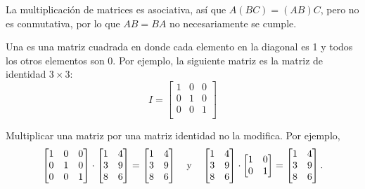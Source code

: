 La multiplicación de matrices es asociativa, así que $A(BC)=(AB)C$, pero
no es conmutativa, por lo que $AB = BA$ no necesariamente se cumple.


Una  es una matriz cuadrada en donde cada elemento en la
diagonal es 1 y todos los otros elementos son 0. Por ejemplo, la siguiente
matriz es la matriz de identidad $3 \times 3$:
\[
    I = \begin{bmatrix}
        1 & 0 & 0 \\
        0 & 1 & 0 \\
        0 & 0 & 1 \\
    \end{bmatrix}
\]

Multiplicar una matriz por una matriz identidad no la modifica. Por ejemplo,
\[
    \begin{bmatrix}
        1 & 0 & 0 \\
        0 & 1 & 0 \\
        0 & 0 & 1 \\
    \end{bmatrix}
    \cdot
    \begin{bmatrix}
        1 & 4 \\
        3 & 9 \\
        8 & 6 \\
    \end{bmatrix}
    =
    \begin{bmatrix}
        1 & 4 \\
        3 & 9 \\
        8 & 6 \\
    \end{bmatrix} \hspace{10px} \textrm{y} \hspace{10px}
    \begin{bmatrix}
        1 & 4 \\
        3 & 9 \\
        8 & 6 \\
    \end{bmatrix}
    \cdot
    \begin{bmatrix}
        1 & 0 \\
        0 & 1 \\
    \end{bmatrix}
    =
    \begin{bmatrix}
        1 & 4 \\
        3 & 9 \\
        8 & 6 \\
    \end{bmatrix}.
\]

